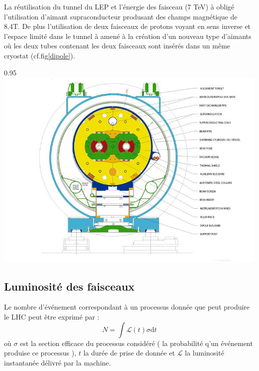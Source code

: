 La réutilisation du tunnel du LEP et l'énergie des faisceau (7 TeV) à obligé l'utilisation d'aimant supraconducteur produsant des champs magnétique de 8.4T. De plus l'utilisation de deux faisceaux de protons voyant en sens inverse et l'espace limité dans le tunnel à amené à la création d'un nouveau type d'aimants où les deux tubes contenant les deux faisceaux sont insérés dans un même cryostat (cf.fig\ref{dipole}).

\begin{minipagewithmarginpars}[h]{0.95\textwidth}
\centering
\includegraphics[width=1\textwidth]{LHC/dipole.jpg}
\label{dipole}	
\end{minipagewithmarginpars}

\subsection{Luminosité des faisceaux}
Le nombre d'événement correspondant à un processus donnée que peut produire le LHC peut être exprimé par :
\begin{equation}
N=\int \mathcal{L}(t)\sigma \mathrm dt
\end{equation}
où $\sigma$ est la section efficace du processus considéré ( la probabilité q'un événement produise ce processus ), $t$ la durée de prise de donnée et $\mathcal{L}$ la luminosité instantanée délivré par la machine.

